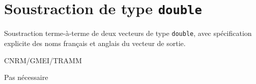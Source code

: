 %
\section{Soustraction de type \texttt{double}}

 

Soustraction terme-\`a-terme de deux vecteurs de type \texttt{double},
avec sp\'ecification explicite des noms fran\c cais et anglais du
vecteur de sortie.

\bigskip





CNRM/GMEI/TRAMM

Pas n\'ecessaire
